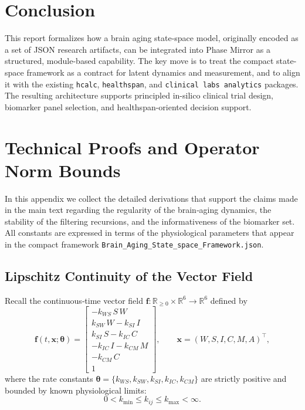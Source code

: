\documentclass[11pt]{article}
\begin{document}
\section{Conclusion}

This report formalizes how a brain aging state-space model, originally encoded as a
set of JSON research artifacts, can be integrated into Phase Mirror as a structured,
module-based capability. The key move is to treat the compact state-space framework
as a contract for latent dynamics and measurement, and to align it with the existing
\texttt{hcalc}, \texttt{healthspan}, and \texttt{clinical labs analytics} packages.
The resulting architecture supports principled in-silico clinical trial design,
biomarker panel selection, and healthspan-oriented decision support.

\appendix
\section{Technical Proofs and Operator Norm Bounds}
\label{app:proofs}

In this appendix we collect the detailed derivations that support the claims made in the main text regarding the regularity of the brain‑aging dynamics, the stability of the filtering recursions, and the informativeness of the biomarker set. All constants are expressed in terms of the physiological parameters that appear in the compact framework \texttt{Brain\_Aging\_State\_space\_Framework.json}.

\subsection{Lipschitz Continuity of the Vector Field}
\label{sub:lipschitz}

Recall the continuous‑time vector field $\bm{f}:\mathbb{R}_{\ge0}\times\mathbb{R}^{6}\to\mathbb{R}^{6}$ defined by
\[
\bm{f}(t,\bm{x};\bm{\theta})=
\begin{bmatrix}
 -k_{WS}\,S\,W \\[2pt]
  k_{SW}\,W - k_{SI}\,I \\[2pt]
  k_{SI}\,S - k_{IC}\,C \\[2pt]
 -k_{IC}\,I - k_{CM}\,M \\[2pt]
 -k_{CM}\,C \\[2pt]
  1
\end{bmatrix},
\qquad
\bm{x}=(W,S,I,C,M,A)^{\top},
\]
where the rate constants $\bm{\theta}=\{k_{WS},k_{SW},k_{SI},k_{IC},k_{CM}\}$ are strictly positive and bounded by known physiological limits:
\[
0 < k_{\min} \le k_{ij} \le k_{\max} < \infty .
\]
\end{document}
